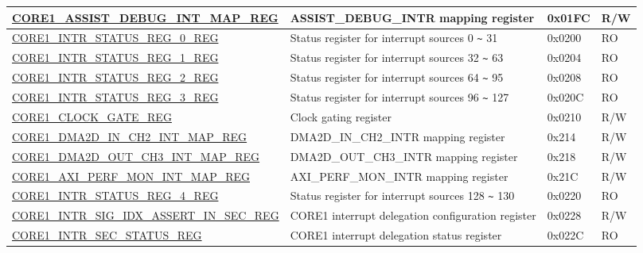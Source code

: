 \begin{longtable}{ | p{7.5cm} | p{7.2cm} | p{1.3cm} | p{1cm} | }
\hyperref[regdesc:CORE1ASSISTDEBUGINTMAPREG]{CORE1\_ASSIST\_DEBUG\_INT\_MAP\_REG} & ASSIST\_DEBUG\_INTR mapping register & 0x01FC & R/W \\ \hline

\hyperref[regdesc:CORE1INTRSTATUSREG0REG]{CORE1\_INTR\_STATUS\_REG\_0\_REG} & Status register for interrupt sources 0 \verb+~+ 31  & 0x0200 & RO \\ \hline

\hyperref[regdesc:CORE1INTRSTATUSREG1REG]{CORE1\_INTR\_STATUS\_REG\_1\_REG} & Status register for interrupt sources 32 \verb+~+ 63  & 0x0204 & RO \\ \hline

\hyperref[regdesc:CORE1INTRSTATUSREG2REG]{CORE1\_INTR\_STATUS\_REG\_2\_REG} & Status register for interrupt sources 64 \verb+~+ 95  & 0x0208 & RO \\ \hline

\hyperref[regdesc:CORE1INTRSTATUSREG3REG]{CORE1\_INTR\_STATUS\_REG\_3\_REG} & Status register for interrupt sources 96 \verb+~+ 127  & 0x020C & RO \\ \hline

\hyperref[regdesc:CORE1CLOCKGATEREG]{CORE1\_CLOCK\_GATE\_REG} & Clock gating register & 0x0210 & R/W \\ \hline


\hyperref[regdesc:CORE1DMA2DINCH2INTMAPREG]{CORE1\_DMA2D\_IN\_CH2\_INT\_MAP\_REG} & DMA2D\_IN\_CH2\_INTR mapping register & 0x214 & R/W \\ \hline

\hyperref[regdesc:CORE1DMA2DOUTCH3INTMAPREG]{CORE1\_DMA2D\_OUT\_CH3\_INT\_MAP\_REG} & DMA2D\_OUT\_CH3\_INTR mapping register & 0x218 & R/W \\ \hline

\hyperref[regdesc:CORE1AXIPERFMONINTMAPREG]{CORE1\_AXI\_PERF\_MON\_INT\_MAP\_REG} & AXI\_PERF\_MON\_INTR mapping register & 0x21C & R/W \\ \hline

\hyperref[regdesc:CORE1INTRSTATUSREG4REG]{CORE1\_INTR\_STATUS\_REG\_4\_REG} & Status register for interrupt sources 128 \verb+~+ 130  & 0x0220 & RO \\ \hline

\hyperref[regdesc:CORE1INTRSIGIDXASSERTINSECREG]{CORE1\_INTR\_SIG\_IDX\_ASSERT\_IN\_SEC\_REG} & CORE1 interrupt delegation configuration register & 0x0228 & R/W \\ \hline

\hyperref[regdesc:CORE1INTRSECSTATUSREG]{CORE1\_INTR\_SEC\_STATUS\_REG} & CORE1 interrupt delegation status register & 0x022C & RO \\ \hline


\end{longtable}
